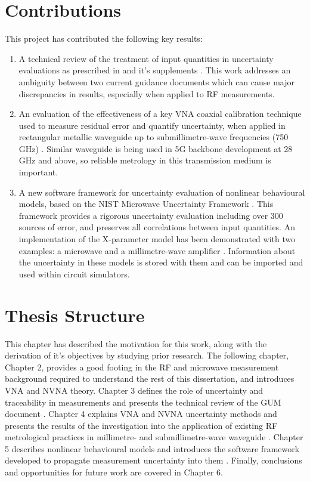 \documentclass[../thesis/thesis.tex]{subfiles}
\begin{document}
\section{Contributions}
This project has contributed the following key results:
\begin{enumerate}
	\item A technical review \cite{Stant_2016} of the treatment of input quantities in uncertainty evaluations as prescribed in \cite{GUM_2008} and it's supplements \cite{GUM_S1,GUM_S2}. This work addresses an ambiguity between two current guidance documents which can cause major discrepancies in results, especially when applied to RF measurements.
	\item An evaluation of the effectiveness of a key VNA coaxial calibration technique used to measure residual error and quantify uncertainty, when applied in rectangular metallic waveguide up to submillimetre-wave frequencies (750 GHz) \cite{Stant_2017}. Similar waveguide is being used in 5G backbone development at 28 GHz and above, so reliable metrology in this transmission medium is important.
	\item A new software framework for uncertainty evaluation of nonlinear behavioural models, based on the NIST Microwave Uncertainty Framework \cite{MUFWebsite}. This framework provides a rigorous uncertainty evaluation including over 300 sources of error, and preserves all correlations between input quantities. An implementation of the X-parameter model has been demonstrated with two examples: a microwave and a millimetre-wave amplifier \cite{Stant_2018_TMTT}. Information about the uncertainty in these models is stored with them and can be imported and used within circuit simulators.
\end{enumerate}

\section{Thesis Structure}
This chapter has described the motivation for this work, along with the derivation of it's objectives by studying prior research. The following chapter, Chapter 2, provides a good footing in the RF and microwave measurement background required to understand the rest of this dissertation, and introduces VNA and NVNA theory. Chapter 3 defines the role of uncertainty and traceability in measurements and presents the technical review of the GUM document \cite{Stant_2016}. Chapter 4 explains VNA and NVNA uncertainty methods and presents the results of the investigation into the application of existing RF metrological practices in millimetre- and submillimetre-wave waveguide \cite{Stant_2017}. Chapter 5 describes nonlinear behavioural models and introduces the software framework developed to propagate measurement uncertainty into them \cite{Stant_2018_TMTT}. Finally, conclusions and opportunities for future work are covered in Chapter 6.

\end{document}
